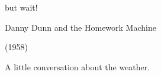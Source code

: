 \documentclass{beamer}
\begin{document}
\begin{frame}[c]
	but wait!
	
	\centering
	\Huge
	Danny Dunn and the Homework Machine
	
	(1958)
\end{frame}

\begin{frame}[plain]
\end{frame}

\begin{frame}
	A little conversation about the weather.
\end{frame}

\begin{frame}[plain]
\end{frame}
\end{document}
